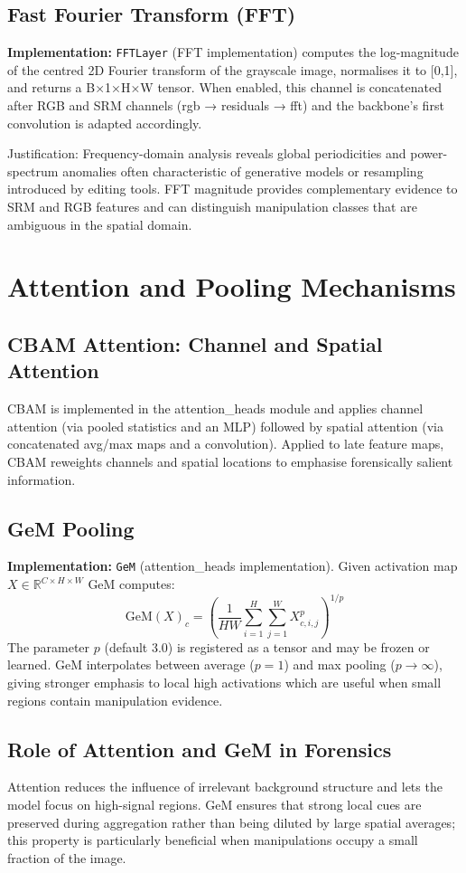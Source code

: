 \documentclass[11pt]{report}
\begin{document}
\subsection{\textbf{Fast Fourier Transform (FFT)}}
\textbf{Implementation:} \texttt{FFTLayer} (FFT implementation)
computes the log-magnitude of the centred 2D Fourier transform of the
grayscale image, normalises it to [0,1], and returns a B×1×H×W tensor. When
enabled, this channel is concatenated after RGB and SRM channels (rgb →
residuals → fft) and the backbone's first convolution is adapted accordingly.

Justification: Frequency-domain analysis reveals global periodicities and
power-spectrum anomalies often characteristic of generative models or
resampling introduced by editing tools. FFT magnitude provides complementary
evidence to SRM and RGB features and can distinguish manipulation classes
that are ambiguous in the spatial domain.

\section{Attention and Pooling Mechanisms}
\subsection{\textbf{CBAM Attention}: Channel and Spatial Attention}
CBAM is implemented in the attention_heads module and applies
channel attention (via pooled statistics and an MLP) followed by spatial
attention (via concatenated avg/max maps and a convolution). Applied to late
feature maps, CBAM reweights channels and spatial locations to emphasise
forensically salient information.

\subsection{\textbf{GeM Pooling}}
\textbf{Implementation:} \texttt{GeM} (attention_heads implementation).
Given activation map $X \in \mathbb{R}^{C\times H\times W}$ GeM computes:
\[
\mathrm{GeM}(X)_c =
\left(
\frac{1}{HW}
\sum_{i=1}^{H}
\sum_{j=1}^{W}
X_{c,i,j}^{p}
\right)^{1/p}
\]
The parameter $p$ (default 3.0) is registered as a tensor and may be frozen
or learned. GeM interpolates between average ($p=1$) and max pooling
($p\to\infty$), giving stronger emphasis to local high activations which are
useful when small regions contain manipulation evidence.

\subsection{Role of Attention and GeM in Forensics}
Attention reduces the influence of irrelevant background structure and lets the
model focus on high-signal regions. GeM ensures that strong local cues are
preserved during aggregation rather than being diluted by large spatial
averages; this property is particularly beneficial when manipulations occupy a
small fraction of the image.
\end{document}
